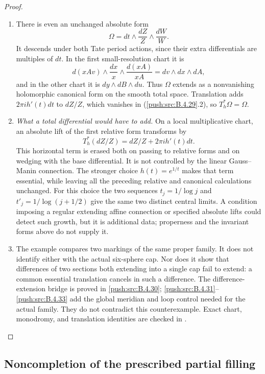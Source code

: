\begin{proof}
\begin{enumerate}[label=\arabic*.,leftmargin=*]
\item There is even an unchanged absolute form
\[
 \Omega=dt\wedge\frac{dZ}{Z}\wedge\frac{dW}{W}.
 \tag{B.4.29.2}
\]
It descends under both Tate period actions,
since their extra differentials are multiples
of $dt$. In the first small-resolution chart
it is
\[
 d(xAv)\wedge\frac{dx}{x}
          \wedge\frac{d(xA)}{xA}
       =dv\wedge dx\wedge dA,
\]
and in the other chart it is
$dy\wedge dB\wedge du$.
Thus $\Omega$ extends as a nonvanishing
holomorphic canonical form on the smooth
total space. Translation adds
$2\pi i h'(t)dt$ to $dZ/Z$, which vanishes
in (\ref{push:src:B.4.29}.2), so $T_h^*\Omega=\Omega$.

\item \emph{What a total differential would have to add.}
On a local multiplicative chart, an absolute
lift of the first relative form transforms by
\[
 T_h^*(dZ/Z)=dZ/Z+2\pi i h'(t)dt.
 \tag{B.4.29.3}
\]
This horizontal term is erased both on passing
to relative forms and on wedging with the base
differential. It is not controlled by the
linear Gauss--Manin connection. The stronger
choice $h(t)=e^{1/t}$ makes that term
essential, while leaving all the preceding
relative and canonical calculations unchanged.
For this choice the two sequences
$t_j=1/\log j$ and
$t'_j=1/\log(j+1/2)$ give the same two
distinct central limits. A condition imposing
a regular extending affine connection or
specified absolute lifts could detect such
growth, but it is additional data; properness
and the invariant forms above do not supply it.

\item The example compares two markings of the same
proper family. It does not identify either
with the actual six-sphere cap. Nor does it
show that differences of two sections both
extending into a single cap fail to extend:
a common essential translation cancels in
such a difference. The difference-extension bridge
is proved in \ref{push:src:B.4.30}; \ref{push:src:B.4.31}--\ref{push:src:B.4.33} add the global
meridian and loop control needed for the actual family.
They do not contradict this counterexample. Exact chart,
monodromy, and translation identities are
checked in
.
\end{enumerate}
\end{proof}

\subsection{Noncompletion of the prescribed partial filling}

